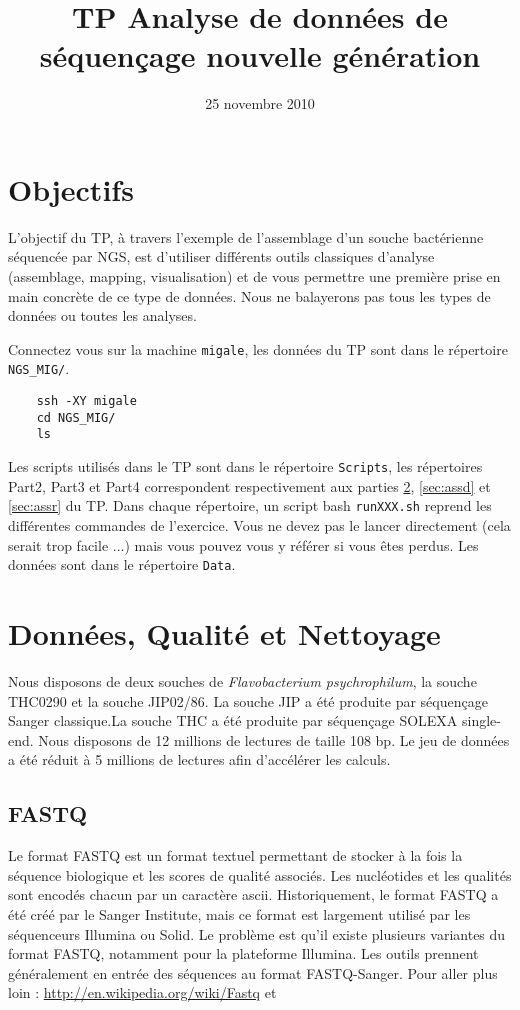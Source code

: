 \documentclass[a4paper,12pt]{article}
\title{TP Analyse de données de séquençage nouvelle génération}
\date{25 novembre 2010}
\begin{document}
 

\maketitle 
\section{Objectifs} 
L'objectif du TP, à travers l'exemple de l'assemblage d'un souche bactérienne séquencée par NGS, est d'utiliser différents outils classiques d'analyse (assemblage, mapping, visualisation) et de vous permettre une première prise en main concrète de ce type de données. Nous ne balayerons pas tous les types de données ou toutes les analyses.

Connectez vous sur la machine \verb=migale=, les données du TP sont dans le répertoire \verb=NGS_MIG/=.
\begin{lstlisting}
	ssh -XY migale
	cd NGS_MIG/
	ls
\end{lstlisting}



Les scripts utilisés dans le TP sont dans le répertoire \verb=Scripts=, les répertoires Part2, Part3 et Part4 correspondent respectivement aux parties \ref{sec:qual}, \ref{sec:assd} et \ref{sec:assr} du TP. Dans chaque répertoire, un script bash \verb=runXXX.sh= reprend les différentes commandes de l'exercice. Vous ne devez pas le lancer directement (cela serait trop facile ...) mais vous pouvez vous y référer si vous êtes perdus. Les données sont dans le répertoire \verb=Data=.


\section{Données, Qualité et Nettoyage}
\label{sec:qual}
Nous disposons de deux souches de \textit{Flavobacterium psychrophilum}, la souche THC0290 et la souche JIP02/86. La souche JIP a été produite par séquençage Sanger classique.La souche THC a été produite par séquençage SOLEXA single-end. Nous disposons de 12 millions de lectures de taille 108 bp. Le jeu de données a été réduit à 5 millions de lectures afin d'accélérer les calculs.

\subsection{FASTQ}
\label{sec:fastq}
Le format FASTQ est un format textuel permettant de stocker à la fois la séquence biologique et les scores de qualité associés. Les nucléotides et les qualités sont encodés chacun par un caractère ascii. Historiquement, le format FASTQ a été créé par le Sanger Institute, mais ce format est largement utilisé par les séquenceurs Illumina ou Solid. Le problème est qu'il existe plusieurs variantes du format FASTQ, notamment pour la plateforme Illumina. Les outils prennent généralement en entrée des séquences au format FASTQ-Sanger.
Pour aller plus loin : \url{http://en.wikipedia.org/wiki/Fastq} et \cite{Cock:2009p1945} 
\end{document}
